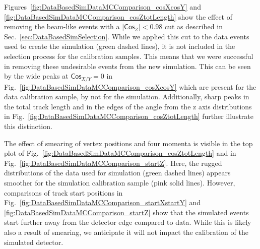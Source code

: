 Figures~\ref{fig:DataBasedSimDataMCComparison_cosXcosY} and \ref{fig:DataBasedSimDataMCComparison_cosZtotLength} show the effect of removing the beam-like events with a $\left|\textsf{Cos}_Z\right|<0.98$ cut as described in Sec.~\ref{sec:DataBasedSimSelection}.  While we applied this cut to the data events used to create the simulation (green dashed lines), it is not included in the selection process for the calibration samples. This means that we were successful in removing these undesirable events from the new simulation. This can be seen by the wide peaks at $\textsf{Cos}_{X/Y}=0$ in Fig.~\ref{fig:DataBasedSimDataMCComparison_cosXcosY} which are present for the data calibration sample, by not for the simulation. Additionally, sharp peaks in the total track length and in the edges of the angle from the z axis distributions in Fig.~\ref{fig:DataBasedSimDataMCComparison_cosZtotLength} further illustrate this distinction.

The effect of smearing of vertex positions and four momenta is visible in the top plot of Fig.~\ref{fig:DataBasedSimDataMCComparison_cosZtotLength} and in Fig.~\ref{fig:DataBasedSimDataMCComparison_startZ}. Here, the rugged distributions of the data used for simulation (green dashed lines) appears smoother for the simulation calibration sample (pink solid lines). However, comparisons of track start positions in Fig.~\ref{fig:DataBasedSimDataMCComparison_startXstartY} and \ref{fig:DataBasedSimDataMCComparison_startZ} show that the simulated events start further away from the detector edge compared to data. While this is likely also a result of smearing, we anticipate it will not impact the calibration of the simulated detector.

